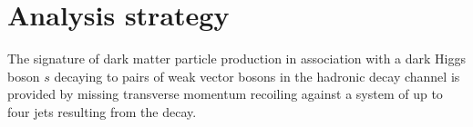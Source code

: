 \begin{table}[htbp]
\caption{List of the signal and background processes with the MC event generators, sets of PDFs and tunes used for their description in the \(\met + \sVV\) search.}
\label{tab:monoSVV:physics:mcsamples:generators}
\centering
{}
\end{table}


\section{Analysis strategy}
\label{sec:monoSVV:analysis}
The signature of dark matter particle production in association with a dark Higgs boson \(s\) decaying to pairs of weak vector bosons in the hadronic decay channel is provided by missing transverse momentum \met recoiling against a system of up to four jets resulting from the  decay.

